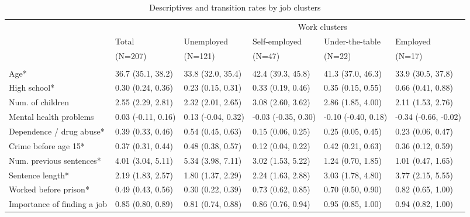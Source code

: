 
\begin{table}[htp]
\scriptsize
\caption{Descriptives and transition rates by job clusters}
\label{tab:job_clusters}
\setlength{\tabcolsep}{5pt}
\renewcommand{\arraystretch}{1.3}
\begin{threeparttable}
\begin{tabular}{llllll}
\hline
\addlinespace[8pt]
& & \multicolumn{4}{c}{Work clusters} \\
\addlinespace
\cmidrule(lr){3-6} 
\addlinespace
& \multicolumn{1}{l}{Total} & \multicolumn{1}{l}{Unemployed} & \multicolumn{1}{l}{Self-employed} & \multicolumn{1}{l}{Under-the-table} & \multicolumn{1}{l}{Employed} \\
& \multicolumn{1}{l}{(N=207)} & \multicolumn{1}{l}{(N=121)} & \multicolumn{1}{l}{(N=47)} & \multicolumn{1}{l}{(N=22)} & \multicolumn{1}{l}{(N=17)} \\
\addlinespace[8pt]
\hline
\addlinespace[12pt]
\multicolumn{6}{l}{\textbf{Descriptives}} \\
\addlinespace
\quad Age* & 36.7 (35.1, 38.2) & 33.8 (32.0, 35.4) & 42.4 (39.3, 45.8) & 41.3 (37.0, 46.3) & 33.9 (30.5, 37.8) \\ 
  \quad High school* & 0.30 (0.24, 0.36) & 0.23 (0.15, 0.31) & 0.33 (0.19, 0.46) & 0.35 (0.15, 0.55) & 0.66 (0.41, 0.88) \\ 
  \quad Num. of children & 2.55 (2.29, 2.81) & 2.32 (2.01, 2.65) & 3.08 (2.60, 3.62) & 2.86 (1.85, 4.00) & 2.11 (1.53, 2.76) \\ 
  \quad Mental health problems & 0.03 (-0.11, 0.16) & 0.13 (-0.04, 0.32) & -0.03 (-0.35, 0.30) & -0.10 (-0.40, 0.18) & -0.34 (-0.66, -0.02) \\ 
  \quad Dependence / drug abuse* & 0.39 (0.33, 0.46) & 0.54 (0.45, 0.63) & 0.15 (0.06, 0.25) & 0.25 (0.05, 0.45) & 0.23 (0.06, 0.47) \\ 
  \quad Crime before age 15* & 0.37 (0.31, 0.44) & 0.48 (0.38, 0.57) & 0.12 (0.04, 0.22) & 0.42 (0.21, 0.63) & 0.36 (0.12, 0.59) \\ 
  \quad Num. previous sentences* & 4.01 (3.04, 5.11) & 5.34 (3.98, 7.11) & 3.02 (1.53, 5.22) & 1.24 (0.70, 1.85) & 1.01 (0.47, 1.65) \\ 
  \quad Sentence length* & 2.19 (1.83, 2.57) & 1.80 (1.37, 2.29) & 2.24 (1.63, 2.88) & 3.03 (1.78, 4.80) & 3.77 (2.15, 5.55) \\ 
  \quad Worked before prison* & 0.49 (0.43, 0.56) & 0.30 (0.22, 0.39) & 0.73 (0.62, 0.85) & 0.70 (0.50, 0.90) & 0.82 (0.65, 1.00) \\ 
  \quad Importance of finding a job & 0.85 (0.80, 0.89) & 0.81 (0.74, 0.88) & 0.86 (0.76, 0.94) & 0.95 (0.85, 1.00) & 0.94 (0.82, 1.00) \\ 

\end{tabular}
\end{threeparttable}
\end{table}
